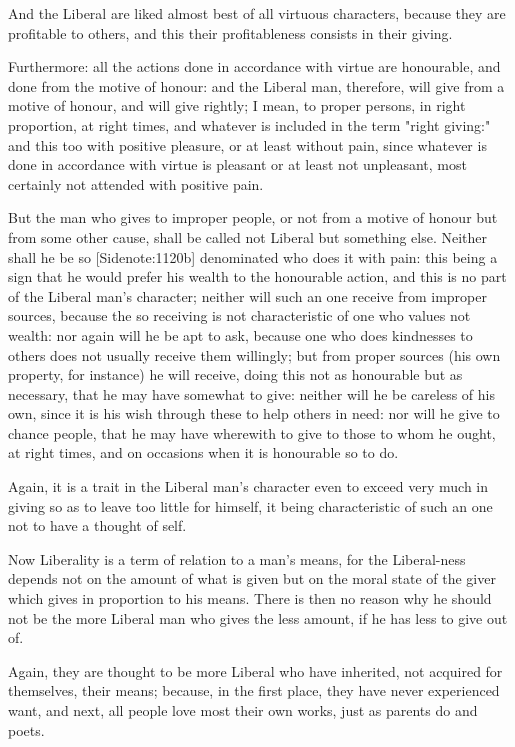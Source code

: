 And the Liberal are liked almost best of all virtuous characters,
because they are profitable to others, and this their profitableness
consists in their giving.

Furthermore: all the actions done in accordance with virtue are
honourable, and done from the motive of honour: and the Liberal man,
therefore, will give from a motive of honour, and will give rightly;
I mean, to proper persons, in right proportion, at right times, and
whatever is included in the term "right giving:" and this too with
positive pleasure, or at least without pain, since whatever is done in
accordance with virtue is pleasant or at least not unpleasant, most
certainly not attended with positive pain.

But the man who gives to improper people, or not from a motive of honour
but from some other cause, shall be called not Liberal but something
else. Neither shall he be so [Sidenote:1120b] denominated who does it
with pain: this being a sign that he would prefer his wealth to the
honourable action, and this is no part of the Liberal man's character;
neither will such an one receive from improper sources, because the so
receiving is not characteristic of one who values not wealth: nor again
will he be apt to ask, because one who does kindnesses to others does
not usually receive them willingly; but from proper sources (his own
property, for instance) he will receive, doing this not as honourable
but as necessary, that he may have somewhat to give: neither will he be
careless of his own, since it is his wish through these to help others
in need: nor will he give to chance people, that he may have wherewith
to give to those to whom he ought, at right times, and on occasions when
it is honourable so to do.

Again, it is a trait in the Liberal man's character even to exceed
very much in giving so as to leave too little for himself, it being
characteristic of such an one not to have a thought of self.

Now Liberality is a term of relation to a man's means, for the
Liberal-ness depends not on the amount of what is given but on the moral
state of the giver which gives in proportion to his means. There is then
no reason why he should not be the more Liberal man who gives the less
amount, if he has less to give out of.

Again, they are thought to be more Liberal who have inherited, not
acquired for themselves, their means; because, in the first place, they
have never experienced want, and next, all people love most their own
works, just as parents do and poets.

